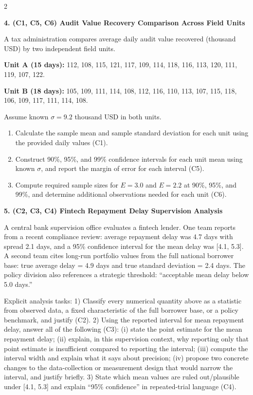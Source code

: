 \documentclass[12pt]{article}
\newcommand{\SubsectionBox}[1]{%
	\noindent\colorbox{gray!30}{%
		\parbox{\linewidth}{\textbf{#1}}%
	}\par\vspace{0.35cm}%
}
\begin{document}
\begin{multicols}{2}
		\vspace{0.25cm}
		\SubsectionBox{4. (C1, C5, C6) Audit Value Recovery Comparison Across Field Units}\vspace{-0.25cm}
		A tax administration compares average daily audit value recovered (thousand USD) by two independent field units.
		
		\textbf{Unit A (15 days):} 112, 108, 115, 121, 117, 109, 114, 118, 116, 113, 120, 111, 119, 107, 122.
		
		\textbf{Unit B (18 days):} 105, 109, 111, 114, 108, 112, 116, 110, 113, 107, 115, 118, 106, 109, 117, 111, 114, 108.
		
		Assume known $\sigma=9.2$ thousand USD in both units.
		\begin{enumerate}
			\item Calculate the sample mean and sample standard deviation for each unit using the provided daily values (C1).
			\item Construct 90\%, 95\%, and 99\% confidence intervals for each unit mean using known $\sigma$, and report the margin of error for each interval (C5).
			\item Compute required sample sizes for $E=3.0$ and $E=2.2$ at 90\%, 95\%, and 99\%, and determine additional observations needed for each unit (C6).
		\end{enumerate}
		
		\vspace{0.25cm}
		\SubsectionBox{5. (C2, C3, C4) Fintech Repayment Delay Supervision Analysis}\vspace{-0.25cm}
		A central bank supervision office evaluates a fintech lender.
		One team reports from a recent compliance review: average repayment delay was 4.7 days with spread 2.1 days, and a 95\% confidence interval for the mean delay was [4.1, 5.3].
		A second team cites long-run portfolio values from the full national borrower base: true average delay = 4.9 days and true standard deviation = 2.4 days.
		The policy division also references a strategic threshold: ``acceptable mean delay below 5.0 days.''
		
		Explicit analysis tasks:
		1) Classify every numerical quantity above as a statistic from observed data, a fixed characteristic of the full borrower base, or a policy benchmark, and justify (C2).
		2) Using the reported interval for mean repayment delay, answer all of the following (C3): (i) state the point estimate for the mean repayment delay; (ii) explain, in this supervision context, why reporting only that point estimate is insufficient compared to reporting the interval; (iii) compute the interval width and explain what it says about precision; (iv) propose two concrete changes to the data-collection or measurement design that would narrow the interval, and justify briefly.
		3) State which mean values are ruled out/plausible under [4.1, 5.3] and explain ``95\% confidence'' in repeated-trial language (C4).
		

\end{multicols}
\end{document}
